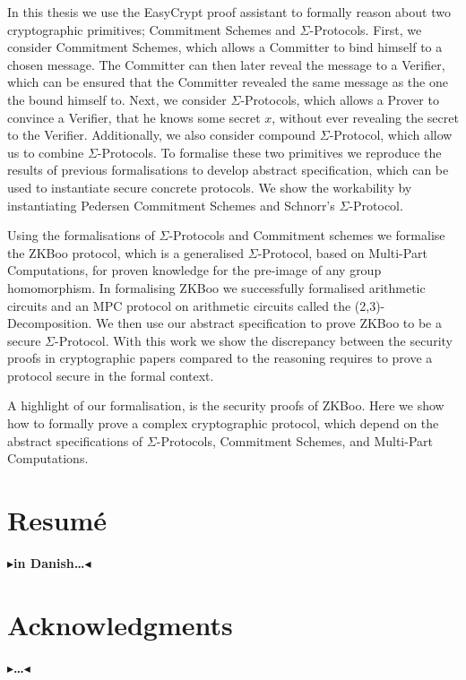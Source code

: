 \documentclass[ twoside,openright,titlepage,numbers=noenddot,headinclude,%
                footinclude=true,cleardoublepage=empty,abstractoff, %
                BCOR=5mm,paper=a4,fontsize=11pt,%
                ngerman,british,%
                ]{scrreprt}
\theoremstyle{definition}                          %
\newcommand{\todo}[1]{{\color[rgb]{.5,0,0}\textbf{$\blacktriangleright$#1$\blacktriangleleft$}}}
\begin{document}
In this thesis we use the EasyCrypt proof assistant to formally reason about two
cryptographic primitives; Commitment Schemes and $\Sigma$-Protocols.
First, we consider Commitment Schemes, which allows a
Committer to bind himself to a chosen message. The Committer can then later
reveal the message to a Verifier, which can be ensured that the Committer
revealed the same message as the one the bound himself to.
Next, we consider $\Sigma$-Protocols, which allows a Prover to convince a
Verifier, that he knows some secret $x$, without ever revealing the secret to
the Verifier. Additionally, we also consider compound $\Sigma$-Protocol, which
allow us to combine $\Sigma$-Protocols.
To formalise these two primitives we reproduce the results of previous
formalisations to develop abstract specification, which can be used to
instantiate secure concrete protocols. We show the workability by instantiating
Pedersen Commitment Schemes and Schnorr's $\Sigma$-Protocol.

Using the formalisations of $\Sigma$-Protocols and Commitment schemes we
formalise the ZKBoo protocol, which is a generalised $\Sigma$-Protocol, based on Multi-Part
Computations, for proven knowledge for the pre-image of any group homomorphism.
In formalising ZKBoo we successfully formalised arithmetic circuits and an MPC
protocol on arithmetic circuits called the (2,3)-Decomposition.
We then use our abstract specification to prove ZKBoo to be a secure $\Sigma$-Protocol.
With this work we show the discrepancy between the security proofs in
cryptographic papers compared to the reasoning requires to prove a protocol
secure in the formal context.

A highlight of our formalisation, is the security proofs of ZKBoo. Here we show how to
formally prove a complex cryptographic protocol, which depend on the abstract
specifications of $\Sigma$-Protocols, Commitment Schemes, and Multi-Part Computations.

\chapter*{Resum\'e}

\todo{in Danish\dots}

\chapter*{Acknowledgments}

\todo{\dots}
\end{document}
